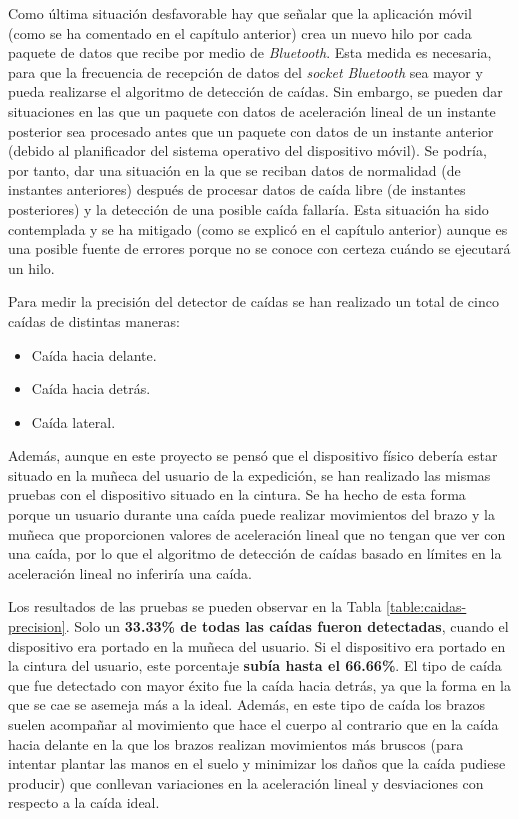 Como última situación desfavorable hay que señalar que la aplicación móvil (como se ha comentado en el capítulo anterior) crea un nuevo hilo por cada paquete de datos que recibe por medio de \textit{Bluetooth}. Esta medida es necesaria, para que la frecuencia de recepción de datos del \textit{socket Bluetooth} sea mayor y pueda realizarse el algoritmo de detección de caídas. Sin embargo, se pueden dar situaciones en las que un paquete con datos de aceleración lineal de un instante posterior sea procesado antes que un paquete con datos de un instante anterior (debido al planificador del sistema operativo del dispositivo móvil). Se podría, por tanto, dar una situación en la que se reciban datos de normalidad (de instantes anteriores) después de procesar datos de caída libre (de instantes posteriores) y la detección de una posible caída fallaría. Esta situación ha sido contemplada y se ha mitigado (como se explicó en el capítulo anterior) aunque es una posible fuente de errores porque no se conoce con certeza cuándo se ejecutará un hilo.

Para medir la precisión del detector de caídas se han realizado un total de cinco caídas de distintas maneras:

\begin{itemize}
\item Caída hacia delante.
\item Caída hacia detrás.
\item Caída lateral.
\end{itemize}

Además, aunque en este proyecto se pensó que el dispositivo físico debería estar situado en la muñeca del usuario de la expedición, se han realizado las mismas pruebas con el dispositivo situado en la cintura. Se ha hecho de esta forma porque un usuario durante una caída puede realizar movimientos del brazo y la muñeca que proporcionen valores de aceleración lineal que no tengan que ver con una caída, por lo que el algoritmo de detección de caídas basado en límites en la aceleración lineal no inferiría una caída.

Los resultados de las pruebas se pueden observar en la Tabla \ref{table:caidas-precision}. Solo un \textbf{33.33\% de todas las caídas fueron detectadas}, cuando el dispositivo era portado en la muñeca del usuario. Si el dispositivo era portado en la cintura del usuario, este porcentaje \textbf{subía hasta el 66.66\%}. El tipo de caída que fue detectado con mayor éxito fue la caída hacia detrás, ya que la forma en la que se cae se asemeja más a la ideal. Además, en este tipo de caída los brazos suelen acompañar al movimiento que hace el cuerpo al contrario que en la caída hacia delante en la que los brazos realizan movimientos más bruscos (para intentar plantar las manos en el suelo y minimizar los daños que la caída pudiese producir) que conllevan variaciones en la aceleración lineal y desviaciones con respecto a la caída ideal.

